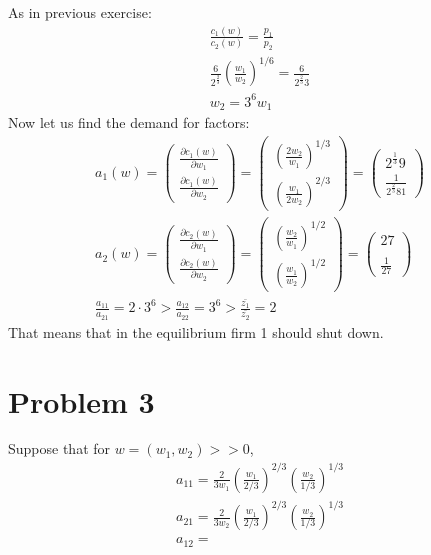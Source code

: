 \documentclass[a4paper]{article}
\begin{document}
As in previous exercise:
\begin{align*}
\frac{c_1(w)}{c_2(w)} = \frac{p_1}{p_2}\\ \frac{6}{2^{\frac{2}{3}}}\left(\frac{w_1}{w_2}\right)^{1/6} = \frac{6}{2^{\frac{2}{3}}3}\\
w_2 = 3^6w_1
\end{align*}
Now let us find the demand for factors:
\begin{align*}
a_1(w) = \begin{pmatrix}
\frac{\partial c_1(w)}{\partial w_1}\\
\frac{\partial c_1(w)}{\partial w_2}
\end{pmatrix} = \begin{pmatrix}
\left(\frac{2w_2}{w_1}\right)^{1/3}\\
\left(\frac{w_1}{2w_2}\right)^{2/3}
\end{pmatrix} = \begin{pmatrix}
2^{\frac{1}{3}}9\\
\frac{1}{2^{\frac{2}{3}}81}
\end{pmatrix}\\
a_2(w) = \begin{pmatrix}
\frac{\partial c_2(w)}{\partial w_1}\\
\frac{\partial c_2(w)}{\partial w_2}
\end{pmatrix} = \begin{pmatrix}
\left(\frac{w_2}{w_1}\right)^{1/2}\\
\left(\frac{w_1}{w_2}\right)^{1/2}
\end{pmatrix} = \begin{pmatrix}
27\\
\\
\frac{1}{27}
\end{pmatrix}\\
\frac{a_{11}}{a_{21}} = 2\cdot 3^6 > \frac{a_{12}}{a_{22}} = 3^6 > \frac{\bar{z_1}}{\bar{z_2}} = 2
\end{align*}
That means that in the equilibrium firm 1 should shut down.

\section*{Problem 3}
Suppose that for $w = (w_1, w_2) >> 0$, \begin{align*}
a_{11} = \frac{2}{3w_1}\left(\frac{w_1}{2/3}\right)^{2/3}\left(\frac{w_2}{1/3}\right)^{1/3}\\
a_{21} = \frac{2}{3w_2}\left(\frac{w_1}{2/3}\right)^{2/3}\left(\frac{w_2}{1/3}\right)^{1/3}\\
a_{12} = 
\end{align*}
\end{document}
